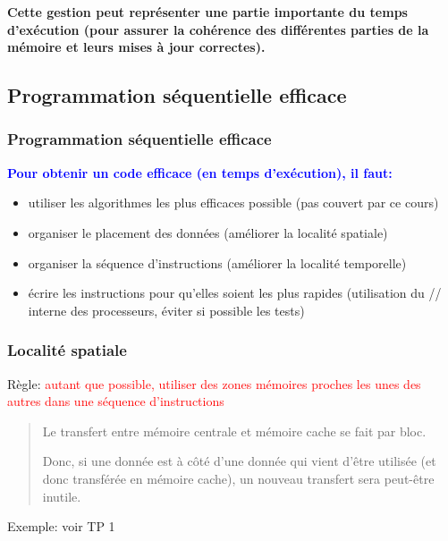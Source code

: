 \documentclass{beamer}
\begin{document}
\begin{frame}[fragile]
	
	\vfill
{\bf Cette gestion peut repr\'esenter une partie im\-por\-tante du temps d'ex\'ecution (pour assurer la coh\'erence des diff\'erentes parties de la m\'emoire et leurs mises \`a jour correctes).}
	\vfill


\end{frame}

\begin{frame}
\section{Programmation s\'equentielle efficace}
\frametitle{Programmation s\'equentielle efficace}

\bf
\textcolor{blue}{Pour obtenir un code efficace (en temps d'ex\'ecution), il faut:}

\begin{itemize}
	\item utiliser les algorithmes les plus efficaces possible (pas couvert par ce cours)
	
	\item organiser le placement des donn\'ees (am\'eliorer la localit\'e spatiale)
	
	\item organiser la s\'equence d'instructions (am\'eliorer la localit\'e temporelle)

	\item \'ecrire les instructions pour qu'elles soient les plus rapides (utilisation du // interne des processeurs, \'eviter si possible les tests)
\end{itemize}
\end{frame}

\begin{frame}
\frametitle{Localit\'e spatiale}
Règle:  \textcolor{red}{autant que possible, utiliser des zones m\'emoires proches les unes des autres dans une s\'equence d'instructions}
\begin{quote}
	Le transfert entre m\'emoire centrale et m\'emoire cache se fait par bloc.
	
	Donc, si une donn\'ee est \`a c\^ot\'e d'une donn\'ee qui vient d'\^etre utilis\'ee (et donc transf\'er\'ee en m\'emoire cache), un nouveau transfert sera peut-\^etre inutile.
\end{quote}

\vfill
Exemple: voir TP 1
\end{frame}
\end{document}
